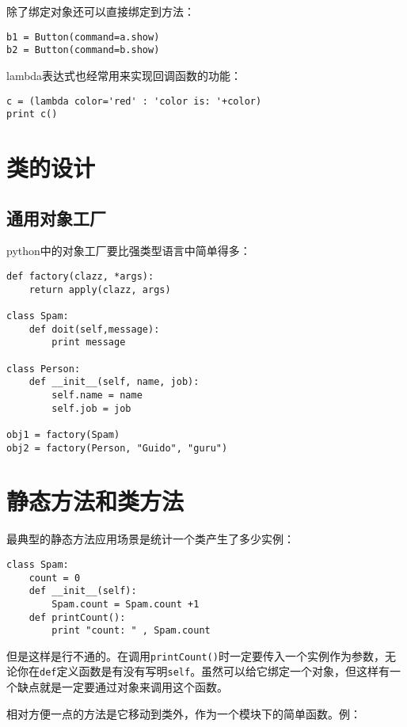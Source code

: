 除了绑定对象还可以直接绑定到方法：

\begin{lstlisting}
b1 = Button(command=a.show)
b2 = Button(command=b.show)
\end{lstlisting}

lambda表达式也经常用来实现回调函数的功能：

\begin{lstlisting}
c = (lambda color='red' : 'color is: '+color)
print c()
\end{lstlisting}

\section{类的设计}

\subsection{通用对象工厂}

python中的对象工厂要比强类型语言中简单得多：

\begin{lstlisting}
def factory(clazz, *args):
	return apply(clazz, args)

class Spam:
	def doit(self,message):
		print message

class Person:
	def __init__(self, name, job):
		self.name = name
		self.job = job

obj1 = factory(Spam)
obj2 = factory(Person, "Guido", "guru")
\end{lstlisting}

\section{静态方法和类方法}

最典型的静态方法应用场景是统计一个类产生了多少实例：

\begin{lstlisting}
class Spam:
	count = 0
	def __init__(self):
		Spam.count = Spam.count +1
	def printCount():
		print "count: " , Spam.count
\end{lstlisting}

但是这样是行不通的。在调用\verb|printCount()|时一定要传入一个实例作为参数，无论你在\verb|def|定义函数是有没有写明\verb|self|。虽然可以给它绑定一个对象，但这样有一个缺点就是一定要通过对象来调用这个函数。

相对方便一点的方法是它移动到类外，作为一个模块下的简单函数。例：

